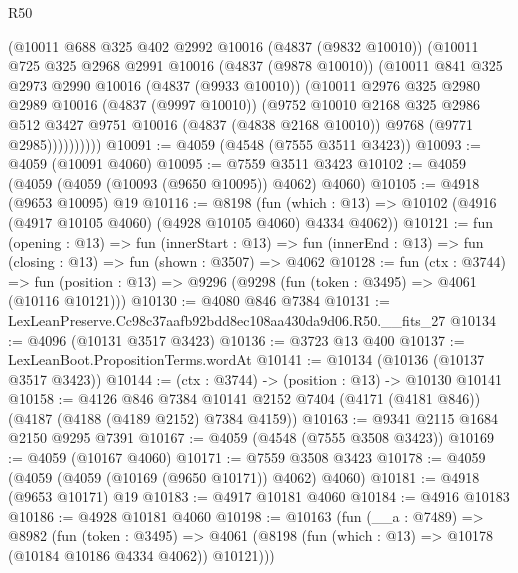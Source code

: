 \begin{lexlean}{R50}
\begin{coremodule}
            (@10011
              @688
              @325
              @402
              @2992
              @10016
              (@4837 (@9832 @10010))
              (@10011
                @725
                @325
                @2968
                @2991
                @10016
                (@4837 (@9878 @10010))
                (@10011
                  @841
                  @325
                  @2973
                  @2990
                  @10016
                  (@4837 (@9933 @10010))
                  (@10011
                    @2976
                    @325
                    @2980
                    @2989
                    @10016
                    (@4837 (@9997 @10010))
                    (@9752
                      @10010
                      @2168
                      @325
                      @2986
                      @512
                      @3427
                      @9751
                      @10016
                      (@4837 (@4838 @2168 @10010))
                      @9768
                      (@9771 @2985))))))))))
@10091 := @4059 (@4548 (@7555 @3511 @3423))
@10093 := @4059 (@10091 @4060)
@10095 := @7559 @3511 @3423
@10102 := @4059 (@4059 (@4059 (@10093 (@9650 @10095)) @4062) @4060)
@10105 := @4918 (@9653 @10095) @19
@10116 := @8198
    (fun (which : @13) => @10102 (@4916 (@4917 @10105 @4060) (@4928 @10105 @4060) @4334 @4062))
@10121 := fun (opening : @13) =>
  fun (innerStart : @13) =>
  fun (innerEnd : @13) => fun (closing : @13) => fun (shown : @3507) => @4062
@10128 := fun (ctx : @3744) =>
  fun (position : @13) => @9296 (@9298 (fun (token : @3495) => @4061 (@10116 @10121)))
@10130 := @4080 @846 @7384
@10131 := LexLeanPreserve.Cc98c37aafb92bdd8ec108aa430da9d06.R50.__fits_27
@10134 := @4096 (@10131 @3517 @3423)
@10136 := @3723 @13 @400
@10137 := LexLeanBoot.PropositionTerms.wordAt
@10141 := @10134 (@10136 (@10137 @3517 @3423))
@10144 := (ctx : @3744) -> (position : @13) -> @10130 @10141
@10158 := @4126
    @846
    @7384
    @10141
    @2152
    @7404
    (@4171 (@4181 @846))
    (@4187 (@4188 (@4189 @2152) @7384 @4159))
@10163 := @9341 @2115 @1684 @2150 @9295 @7391
@10167 := @4059 (@4548 (@7555 @3508 @3423))
@10169 := @4059 (@10167 @4060)
@10171 := @7559 @3508 @3423
@10178 := @4059 (@4059 (@4059 (@10169 (@9650 @10171)) @4062) @4060)
@10181 := @4918 (@9653 @10171) @19
@10183 := @4917 @10181 @4060
@10184 := @4916 @10183
@10186 := @4928 @10181 @4060
@10198 := @10163
    (fun (__a : @7489) =>
    @8982
      (fun (token : @3495) =>
      @4061 (@8198 (fun (which : @13) => @10178 (@10184 @10186 @4334 @4062)) @10121)))

\end{coremodule}
\end{lexlean}
